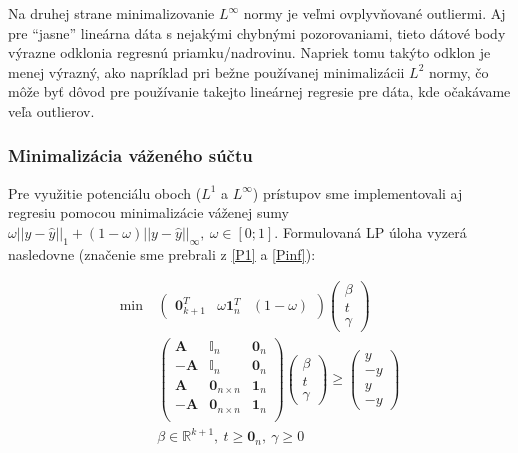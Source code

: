 \documentclass[report.tex]{subfiles}
\begin{document}
Na druhej strane minimalizovanie $L^{\infty}$ normy je veľmi ovplyvňované outliermi. Aj pre \enquote{jasne} lineárna dáta s nejakými chybnými pozorovaniami, tieto dátové body výrazne odklonia regresnú priamku/nadrovinu. Napriek tomu takýto odklon je menej výrazný, ako napríklad pri bežne používanej minimalizácii $L^2$ normy, čo môže byť dôvod pre používanie takejto lineárnej regresie pre dáta, kde očakávame veľa outlierov.

\subsubsection{Minimalizácia váženého súčtu}

Pre využitie potenciálu oboch ($L^1$ a $L^{\infty}$) prístupov sme implementovali aj regresiu pomocou minimalizácie váženej sumy $\omega||y - \hat{y}||_1 + (1-\omega)||y - \hat{y}||_{\infty},~\omega \in [0;1]$. Formulovaná LP úloha vyzerá nasledovne (značenie sme prebrali z \eqref{P1} a \eqref{Pinf}):


\begin{align*}
	\text{min}~ &
	\left(
	\begin{array}{c|c|c}
		\mathbf{0}_{k+1}^T & \omega\mathbf{1}_n^T & (1 - \omega)
	\end{array}
	\right)
	\left(
	\begin{array}{c}
		\beta \\
		\hline
		t \\
		\hline
		\gamma
	\end{array}
	\right) \\
	&\left(
	\begin{array}{c|c|c}
		\mathbf{A} & \mathbb{I}_n & \mathbf{0}_n \\
		\hline
		-\mathbf{A} & \mathbb{I}_n & \mathbf{0}_n \\
		\hline
		\mathbf{A} & \mathbf{0}_{n \times n} & \mathbf{1}_n \\
		\hline
		-\mathbf{A} & \mathbf{0}_{n \times n} & \mathbf{1}_n \\
	\end{array}
	\right)
	\left(
	\begin{array}{c}
		\beta \\
		\hline
		t \\
		\hline
		\gamma
	\end{array}
	\right)
	\geq
	\left(
	\begin{array}{c}
		y \\
		\hline
		-y \\
		\hline
		y \\
		\hline
		-y
	\end{array}
	\right) \\
	&\beta \in \mathbb{R}^{k+1},~t \geq \mathbf{0}_{n},~\gamma \geq 0
\end{align*}
\end{document}
